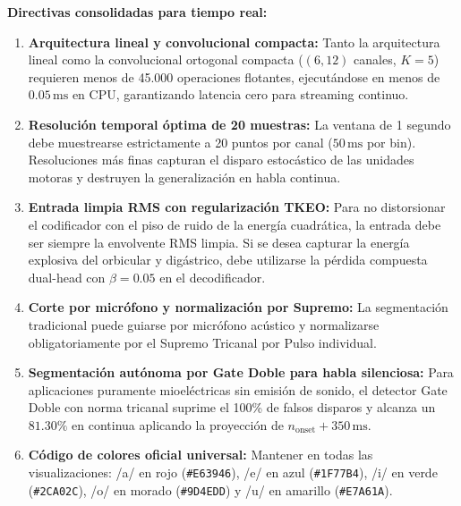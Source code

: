 \documentclass[11pt,a4paper]{article}
\begin{document}
\textbf{Directivas consolidadas para tiempo real:}
\begin{enumerate}
    \item \textbf{Arquitectura lineal y convolucional compacta:} Tanto la arquitectura lineal como la convolucional ortogonal compacta ($(6, 12)$ canales, $K=5$) requieren menos de 45.000 operaciones flotantes, ejecutándose en menos de $0.05\,\text{ms}$ en CPU, garantizando latencia cero para streaming continuo.
    \item \textbf{Resolución temporal óptima de 20 muestras:} La ventana de 1 segundo debe muestrearse estrictamente a 20 puntos por canal ($50\,\text{ms}$ por bin). Resoluciones más finas capturan el disparo estocástico de las unidades motoras y destruyen la generalización en habla continua.
    \item \textbf{Entrada limpia RMS con regularización TKEO:} Para no distorsionar el codificador con el piso de ruido de la energía cuadrática, la entrada debe ser siempre la envolvente RMS limpia. Si se desea capturar la energía explosiva del orbicular y digástrico, debe utilizarse la pérdida compuesta dual-head con $\beta = 0.05$ en el decodificador.
    \item \textbf{Corte por micrófono y normalización por Supremo:} La segmentación tradicional puede guiarse por micrófono acústico y normalizarse obligatoriamente por el Supremo Tricanal por Pulso individual.
    \item \textbf{Segmentación autónoma por Gate Doble para habla silenciosa:} Para aplicaciones puramente mioeléctricas sin emisión de sonido, el detector Gate Doble con norma tricanal suprime el 100\% de falsos disparos y alcanza un $81.30\%$ en continua aplicando la proyección de $n_{\text{onset}} + 350\,\text{ms}$.
    \item \textbf{Código de colores oficial universal:} Mantener en todas las visualizaciones: /a/ en rojo (\texttt{\#E63946}), /e/ en azul (\texttt{\#1F77B4}), /i/ en verde (\texttt{\#2CA02C}), /o/ en morado (\texttt{\#9D4EDD}) y /u/ en amarillo (\texttt{\#E7A61A}).
\end{enumerate}
\end{document}

